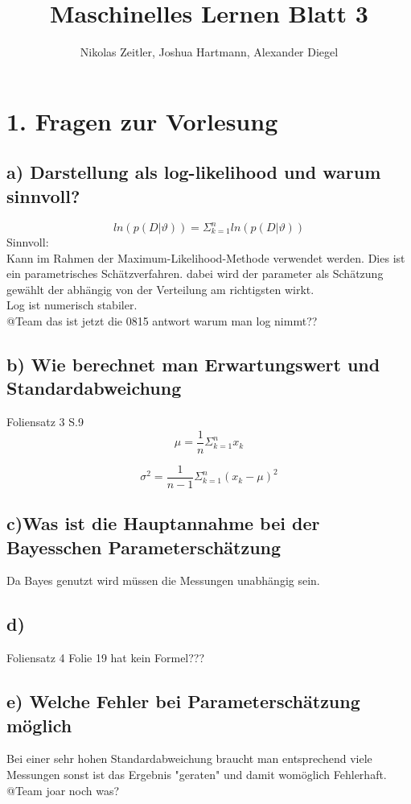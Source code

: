\documentclass{scrartcl}
\author{Nikolas Zeitler, Joshua Hartmann, Alexander Diegel}
\title{Maschinelles Lernen Blatt 3}
\begin{document}
\maketitle
\section*{1. Fragen zur Vorlesung}
\subsection*{a) Darstellung als log-likelihood und warum sinnvoll?}
\[ ln (p(D|\vartheta)) = \Sigma^n_{k=1} ln (p(D|\vartheta)) \]
Sinnvoll: \\
Kann im Rahmen der Maximum-Likelihood-Methode verwendet werden. Dies ist ein parametrisches Schätzverfahren. dabei wird der parameter als Schätzung gewählt der abhängig von der Verteilung am richtigsten wirkt.\\
Log ist numerisch stabiler.  \\
@Team das ist jetzt die 0815 antwort warum man log nimmt??
\subsection*{b) Wie berechnet man Erwartungswert und Standardabweichung}
Foliensatz 3 S.9 \\
\[\mu = \frac{1}{n}\Sigma^n_{k=1}x_k \]

\[\sigma^2 = \frac{1}{n-1}\Sigma^n_{k=1}(x_k-\mu)^2 \]

\subsection*{c)Was ist die Hauptannahme bei der Bayesschen Parameterschätzung}
Da Bayes genutzt wird müssen die Messungen unabhängig sein. 
\subsection*{d)}
Foliensatz 4 Folie 19 hat kein Formel???

\subsection*{e) Welche Fehler bei Parameterschätzung möglich}
Bei einer sehr hohen Standardabweichung braucht man entsprechend viele Messungen sonst ist das Ergebnis "geraten" und damit womöglich Fehlerhaft.\\
@Team joar noch was?
\end{document}
